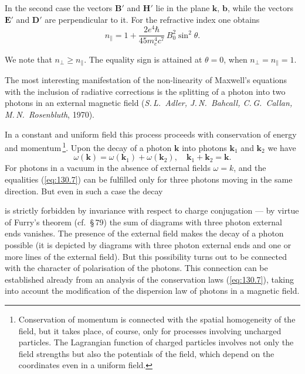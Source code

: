 In the second case the vectors $\mathbf{B}'$ and $\mathbf{H}'$ lie in the plane $\mathbf{k}$, $\mathbf{b}$, while the vectors $\mathbf{E}'$ and $\mathbf{D}'$ are perpendicular to it. For the refractive index one obtains
\begin{equation}
n_\parallel = 1 + \frac{2e^4\hbar}{45m^4_ec^7}\,B_0^2\sin^2\theta.
\label{eq:130.6}
\end{equation}

We note that $n_\perp \geqslant n_\parallel$. The equality sign is attained at $\theta = 0$, when $n_\perp = n_\parallel = 1$.

The most interesting manifestation of the non-linearity of Maxwell's equations with the inclusion of radiative corrections is the splitting of a photon into two photons in an external magnetic field (\emph{S.\,L.~Adler, J.\,N.~Bahcall, C.\,G.~Callan, M.\,N.~Rosenbluth}, 1970).

In a constant and uniform field this process proceeds with conservation of energy and momentum\,\footnote{Conservation of momentum is connected with the spatial homogeneity of the field, but it takes place, of course, only for processes involving uncharged particles. The Lagrangian function of charged particles involves not only the field strengths but also the potentials of the field, which depend on the coordinates even in a uniform field.}. Upon the decay of a photon $\mathbf{k}$ into photons $\mathbf{k}_1$ and $\mathbf{k}_2$ we have
\begin{equation}
\omega(\mathbf{k}) = \omega(\mathbf{k}_1) + \omega(\mathbf{k}_2),\quad \mathbf{k}_1 + \mathbf{k}_2 = \mathbf{k}.
\label{eq:130.7}
\end{equation}
For photons in a vacuum in the absence of external fields $\omega = k$, and the equalities (\ref{eq:130.7}) can be fulfilled only for three photons moving in the same direction. But even in such a case the decay


\noindent is strictly forbidden by invariance with respect to charge conjugation --- by virtue of Furry's theorem (cf.\ \S\,79) the sum of diagrams with three photon external ends vanishes. The presence of the external field makes the decay of a photon possible (it is depicted by diagrams with three photon external ends and one or more lines of the external field). But this possibility turns out to be connected with the character of polarisation of the photons. This connection can be established already from an analysis of the conservation laws (\ref{eq:130.7}), taking into account the modification of the dispersion law of photons in a magnetic field.

